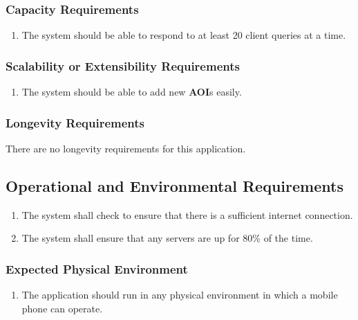 \documentclass[titlepage]{article}
\newcounter{req}
\begin{document}
		\subsubsection{Capacity Requirements}
		\label{ssub:capacity_requirements}
		\begin{enumerate}[{PR}1. ]
		\setcounter{enumi}{\value{req}}
			\item 
			The system should be able to respond to at least 20 client queries at a time.
		\setcounter{req}{\theenumi}
		\end{enumerate}
		
		\subsubsection{Scalability or Extensibility Requirements}
		\label{ssub:scalability_or_extensibility_requirements}
		\begin{enumerate}[{PR}1.]
		\setcounter{enumi}{\value{req}}
			\item
			The system should be able to add new \textbf{AOI}s easily.
		\setcounter{req}{\theenumi}
		\end{enumerate}
		
		\subsubsection{Longevity Requirements}
		\label{ssub:longevity_requirements}
		There are no longevity requirements for this application.
		
		
		\subsection{Operational and Environmental Requirements}
		\setcounter{req}{0}
		\label{sub:operational_and_environmental_requirements}
		\begin{enumerate}[{OE}1. ]
		\setcounter{enumi}{\value{req}}
			\item
			The system shall check to ensure that there is a sufficient internet connection.
			\item
			The system shall ensure that any servers are up for 80\% of the time.
		\setcounter{req}{\theenumi}
		\end{enumerate}
		
		\subsubsection{Expected Physical Environment}
		\label{ssub:expected_physical_environment}
		\begin{enumerate}[{OE}1. ]
		\setcounter{enumi}{\value{req}}
			\item
			The application should run in any physical environment in which a mobile phone can operate.
		\setcounter{req}{\theenumi}
		\end{enumerate}
		
\end{document}
